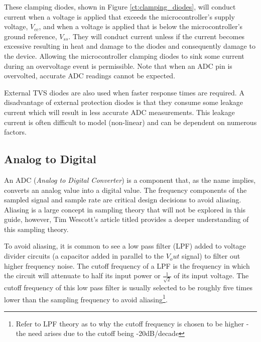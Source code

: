 \documentclass[main.tex]{subfiles}
\begin{document}
\noindent These clamping diodes, shown in Figure \ref{ct:clamping_diodes}, will conduct current when a voltage is applied that exceeds the microcontroller's supply voltage, $V_{cc}$, and when a voltage is applied that is below the microcontroller's ground reference, $V_{ss}$. They will conduct current unless if the current becomes excessive resulting in heat and damage to the diodes and consequently damage to the device. Allowing the microcontroller clamping diodes to sink some current during an overvoltage event is permissible. Note that when an ADC pin is overvolted, accurate ADC readings cannot be expected. \newline

\newnoindentpara External TVS diodes are also used when faster response times are required. A disadvantage of external protection diodes is that they consume some leakage current which will result in less accurate ADC measurements. This leakage current is often difficult to model (non-linear) and can be dependent on numerous factors.

\subsection{Analog to Digital}
An ADC (\textit{Analog to Digital Converter}) is a component that, as the name implies, converts an analog value into a digital value. The frequency components of the sampled signal and sample rate are critical design decisions to avoid aliasing. Aliasing is a large concept in sampling theory that will not be explored in this guide, however, Tim Wescott's article titled  provides a deeper understanding of this sampling theory. \newline

\newnoindentpara To avoid aliasing, it is common to see a low pass filter (LPF) added to voltage divider circuits (a capacitor added in parallel to the $V_out$ signal) to filter out higher frequency noise. The cutoff frequency of a LPF is the frequency in which the circuit will attenuate to half its input power or $\frac{1}{\sqrt{2}}$ of its input voltage. The cutoff frequency of this low pass filter is usually selected to be roughly five times lower than the sampling frequency to avoid aliasing\footnote{Refer to LPF theory as to why the cutoff frequency is chosen to be higher - the need arises due to the cutoff being -20dB/decade}. 
\end{document}
